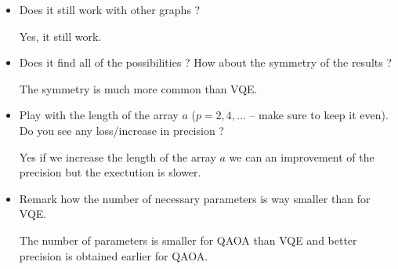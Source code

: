 \documentclass{article}
\theoremstyle{plain}
\begin{document}
  \begin{itemize}
    \item Does it still work with other graphs ?
      
      Yes, it still work.

    \item Does it find all of the possibilities ? How about the symmetry of
      the results ?

      The symmetry is much more common than VQE.

    \item Play with the length of the array $a$ ($p=2,4,...$ -- make sure to
      keep it even). Do you see any loss/increase in precision ?

      Yes if we increase the length of the array $a$ we can an improvement of
      the precision but the exectution is slower.


    \item Remark how the number of necessary parameters is way smaller than for
      VQE.

      The number of parameters is smaller for QAOA than VQE and better precision
      is obtained earlier for QAOA.


  \end{itemize}
\end{document}
